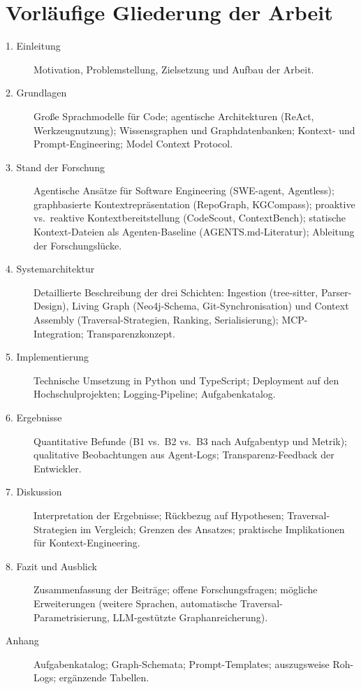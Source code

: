 \section{Vorläufige Gliederung der Arbeit}

\begin{description}
  \item[1. Einleitung] Motivation, Problemstellung, Zielsetzung und Aufbau der Arbeit.

  \item[2. Grundlagen] Große Sprachmodelle für Code; agentische Architekturen (ReAct, Werkzeugnutzung); Wissensgraphen und Graphdatenbanken; Kontext- und Prompt-Engineering; Model Context Protocol.

  \item[3. Stand der Forschung] Agentische Ansätze für Software Engineering (SWE-agent, Agentless); graphbasierte Kontextrepräsentation (RepoGraph, KGCompass); proaktive vs.\ reaktive Kontextbereitstellung (CodeScout, ContextBench); statische Kontext-Dateien als Agenten-Baseline (AGENTS.md-Literatur); Ableitung der Forschungslücke.

  \item[4. Systemarchitektur] Detaillierte Beschreibung der drei Schichten: Ingestion (tree-sitter, Parser-Design), Living Graph (Neo4j-Schema, Git-Synchronisation) und Context Assembly (Traversal-Strategien, Ranking, Serialisierung); MCP-Integration; Transparenzkonzept.

  \item[5. Implementierung] Technische Umsetzung in Python und TypeScript; Deployment auf den Hochschulprojekten; Logging-Pipeline; Aufgabenkatalog.

  \item[6. Ergebnisse] Quantitative Befunde (B1 vs.\ B2 vs.\ B3 nach Aufgabentyp und Metrik); qualitative Beobachtungen aus Agent-Logs; Transparenz-Feedback der Entwickler.

  \item[7. Diskussion] Interpretation der Ergebnisse; Rückbezug auf Hypothesen; Traversal-Strategien im Vergleich; Grenzen des Ansatzes; praktische Implikationen für Kontext-Engineering.

  \item[8. Fazit und Ausblick] Zusammenfassung der Beiträge; offene Forschungsfragen; mögliche Erweiterungen (weitere Sprachen, automatische Traversal-Parametrisierung, LLM-gestützte Graphanreicherung).

  \item[Anhang] Aufgabenkatalog; Graph-Schemata; Prompt-Templates; auszugsweise Roh-Logs; ergänzende Tabellen.
\end{description}
